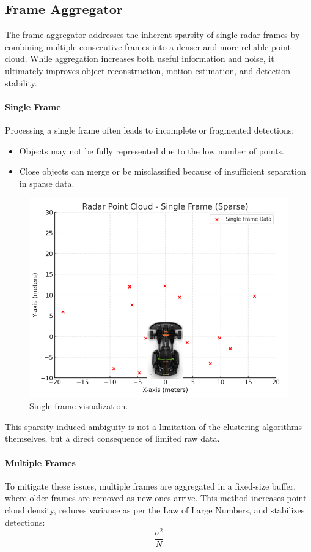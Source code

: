 \vspace{0.5em}
\subsection{Frame Aggregator}  
The frame aggregator addresses the inherent sparsity of single radar frames by combining multiple consecutive frames into a denser and more reliable point cloud.  
While aggregation increases both useful information and noise, it ultimately improves object reconstruction, motion estimation, and detection stability.

\paragraph{Single Frame}
Processing a single frame often leads to incomplete or fragmented detections:
\begin{itemize}
    \item Objects may not be fully represented due to the low number of points.
    \item Close objects can merge or be misclassified because of insufficient separation in sparse data.
\end{itemize}

\begin{figure}[!htbp]
    \centering
    \includegraphics[width=0.5\linewidth]{images/singleframe.png}
    \caption{Single-frame visualization.}
    \label{fig:single_frame}
\end{figure}

This sparsity-induced ambiguity is not a limitation of the clustering algorithms themselves, but a direct consequence of limited raw data.

\paragraph{Multiple Frames}
To mitigate these issues, multiple frames are aggregated in a fixed-size buffer, where older frames are removed as new ones arrive.  
This method increases point cloud density, reduces variance as per the Law of Large Numbers, and stabilizes detections:
\begin{equation}
    \frac{\sigma^2}{N}
    \label{eq:variance_per_sample_size}
\end{equation}

